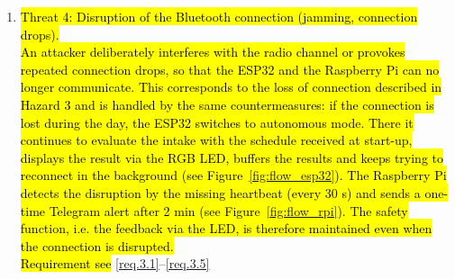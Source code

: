 \begin{enumerate}
  \item \hl{Threat 4: Disruption of the Bluetooth connection (jamming,
  connection drops).}\\
  \hl{An attacker deliberately interferes with the radio channel or provokes
  repeated connection drops, so that the ESP32 and the Raspberry Pi can no
  longer communicate. This corresponds to the loss of connection described in
  Hazard 3 and is handled by the same countermeasures: if the connection is lost
  during the day, the ESP32 switches to autonomous mode. There it continues to
  evaluate the intake with the schedule received at start-up, displays the
  result via the RGB LED, buffers the results and keeps trying to reconnect in
  the background (see Figure~\ref{fig:flow_esp32}). The Raspberry Pi detects the disruption by the
  missing heartbeat (every 30 s) and sends a one-time Telegram alert after 2 min
  (see Figure~\ref{fig:flow_rpi}). The safety function, i.e. the feedback via the LED, is
  therefore maintained even when the connection is disrupted.}\\
  \hl{Requirement see} \ref{req.3.1}--\ref{req.3.5}


\end{enumerate}

